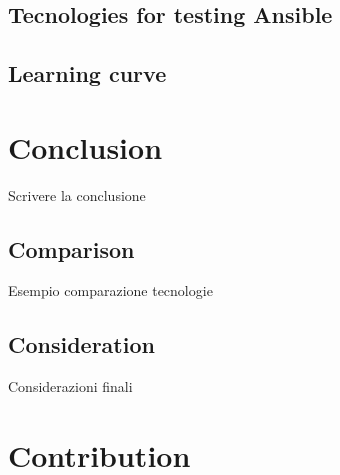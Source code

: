 \documentclass[12pt,a4paper,openright,twoside]{book}
\begin{document}
\section{Tecnologies for testing Ansible}


\section{Learning curve}




\chapter{Conclusion}
Scrivere la conclusione

\section{Comparison}
Esempio comparazione tecnologie

\section{Consideration}
Considerazioni finali



\chapter{Contribution}
\end{document}
